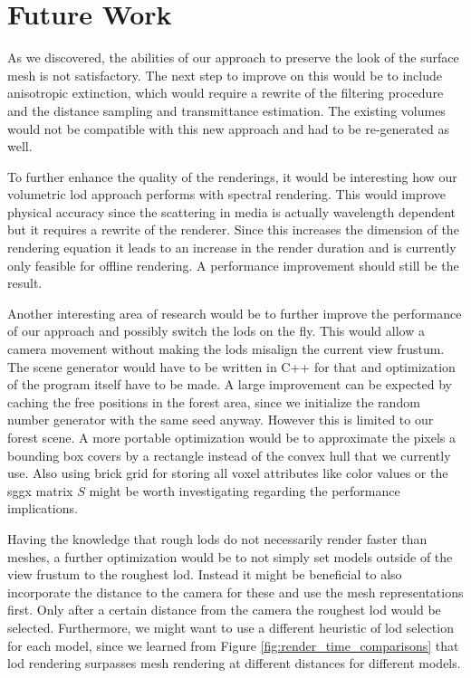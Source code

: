 \chapter{Future Work}
\label{chap:future_work}
As we discovered, the abilities of our approach to preserve the look of the surface mesh is not satisfactory.
The next step to improve on this would be to include anisotropic extinction, which would require a rewrite of the filtering procedure and the distance sampling and transmittance estimation.
The existing volumes would not be compatible with this new approach and had to be re-generated as well.

To further enhance the quality of the renderings, it would be interesting how our volumetric \ac{lod} approach performs with spectral rendering.
This would improve physical accuracy since the scattering in media is actually wavelength dependent \cite{novak_overview} but it requires a rewrite of the renderer.
Since this increases the dimension of the rendering equation it leads to an increase in the render duration and is currently only feasible for offline rendering.
A performance improvement should still be the result.

Another interesting area of research would be to further improve the performance of our approach and possibly switch the \acsp{lod} on the fly.
This would allow a camera movement without making the \acsp{lod} misalign the current view frustum.
The scene generator would have to be written in C++ for that and optimization of the program itself have to be made.
A large improvement can be expected by caching the free positions in the forest area, since we initialize the random number generator with the same seed anyway.
However this is limited to our forest scene.
A more portable optimization would be to approximate the pixels a bounding box covers by a rectangle instead of the convex hull that we currently use.
Also using brick grid for storing all voxel attributes like color values or the \ac{sggx} matrix $S$ might be worth investigating regarding the performance implications.

Having the knowledge that rough \acsp{lod} do not necessarily render faster than meshes, a further optimization would be to not simply set models outside of the view frustum to the roughest \ac{lod}.
Instead it might be beneficial to also incorporate the distance to the camera for these and use the mesh representations first.
Only after a certain distance from the camera the roughest \ac{lod} would be selected.
Furthermore, we might want to use a different heuristic of \ac{lod} selection for each model, since we learned from Figure \ref{fig:render_time_comparisons} that \ac{lod} rendering surpasses mesh rendering at different distances for different models.